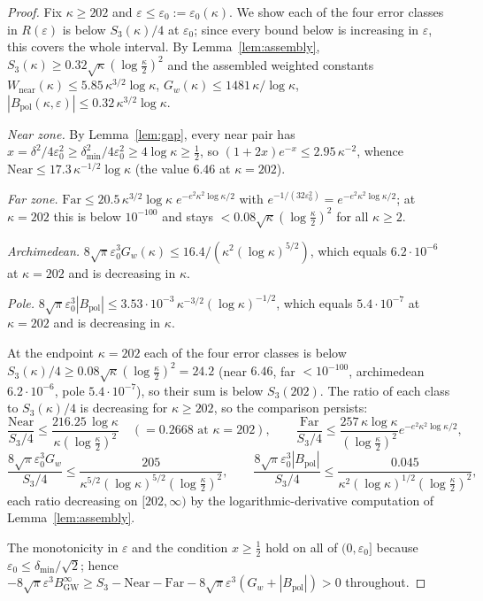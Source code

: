 \documentclass[11pt]{article}
\newcommand{\BinfGW}{B_{\mathrm{GW}}^{\infty}}   %
\newcommand{\dmin}{\delta_{\min}}           %
\begin{document}
\begin{proof}
Fix $\kappa\ge 202$ and $\varepsilon\le\varepsilon_0:=\varepsilon_0(\kappa)$.
We show each of the four error classes in $R(\varepsilon)$ is below
$S_3(\kappa)/4$ at $\varepsilon_0$; since every bound below is increasing in
$\varepsilon$, this covers the whole interval.
By Lemma~\ref{lem:assembly},
$S_3(\kappa)\ge 0.32\sqrt\kappa(\log\tfrac\kappa2)^2$ and the assembled
weighted constants
$W_{\mathrm{near}}(\kappa)\le 5.85\,\kappa^{3/2}\log\kappa$,
$G_w(\kappa)\le 1481\,\kappa/\log\kappa$,
$|B_{\mathrm{pol}}(\kappa,\varepsilon)|\le 0.32\,\kappa^{3/2}\log\kappa$.

\emph{Near zone.}
By Lemma~\ref{lem:gap}, every near pair has
$x=\delta^2/4\varepsilon_0^2\ge\dmin^2/4\varepsilon_0^2\ge 4\log\kappa\ge\tfrac12$,
so $(1+2x)e^{-x}\le 2.95\,\kappa^{-2}$, whence
$\mathrm{Near}\le 17.3\,\kappa^{-1/2}\log\kappa$ (the value $6.46$ at
$\kappa=202$).

\emph{Far zone.}
$\mathrm{Far}\le 20.5\,\kappa^{3/2}\log\kappa\;e^{-e^2\kappa^2\log\kappa/2}$
with $e^{-1/(32\varepsilon_0^2)}=e^{-e^2\kappa^2\log\kappa/2}$; at $\kappa=202$
this is below $10^{-100}$ and stays $<0.08\sqrt\kappa(\log\tfrac\kappa2)^2$
for all $\kappa\ge 2$.

\emph{Archimedean.}
$8\sqrt\pi\varepsilon_0^3 G_w(\kappa)\le 16.4/(\kappa^2(\log\kappa)^{5/2})$,
which equals $6.2\cdot10^{-6}$ at $\kappa=202$ and is decreasing in $\kappa$.

\emph{Pole.}
$8\sqrt\pi\varepsilon_0^3|B_{\mathrm{pol}}|
\le 3.53\cdot10^{-3}\,\kappa^{-3/2}(\log\kappa)^{-1/2}$, which equals
$5.4\cdot10^{-7}$ at $\kappa=202$ and is decreasing in $\kappa$.

At the endpoint $\kappa=202$ each of the four error classes is below
$S_3(\kappa)/4\ge 0.08\sqrt\kappa(\log\tfrac\kappa2)^2=24.2$ (near $6.46$,
far $<10^{-100}$, archimedean $6.2\cdot10^{-6}$, pole $5.4\cdot10^{-7}$), so
their sum is below $S_3(202)$. The ratio of each class to $S_3(\kappa)/4$ is
decreasing for $\kappa\ge 202$, so the comparison persists:
\[
\frac{\mathrm{Near}}{S_3/4}\le\frac{216.25\,\log\kappa}{\kappa(\log\tfrac\kappa2)^2}
\quad(=0.2668\text{ at }\kappa=202),
\qquad
\frac{\mathrm{Far}}{S_3/4}\le \frac{257\,\kappa\log\kappa}{(\log\tfrac\kappa2)^2}
e^{-e^2\kappa^2\log\kappa/2},
\]
\[
\frac{8\sqrt\pi\varepsilon_0^3 G_w}{S_3/4}
 \le\frac{205}{\kappa^{5/2}(\log\kappa)^{5/2}(\log\tfrac\kappa2)^2},
\qquad
\frac{8\sqrt\pi\varepsilon_0^3|B_{\mathrm{pol}}|}{S_3/4}
 \le\frac{0.045}{\kappa^{2}(\log\kappa)^{1/2}(\log\tfrac\kappa2)^2},
\]
each ratio decreasing on $[202,\infty)$ by the logarithmic-derivative
computation of Lemma~\ref{lem:assembly}.

The monotonicity in $\varepsilon$ and the condition $x\ge\tfrac12$ hold on
all of $(0,\varepsilon_0]$ because $\varepsilon_0\le\dmin/\sqrt2$; hence
$-8\sqrt\pi\varepsilon^3\BinfGW\ge S_3-\mathrm{Near}-\mathrm{Far}
-8\sqrt\pi\varepsilon^3(G_w+|B_{\mathrm{pol}}|)>0$ throughout.
\end{proof}
\end{document}
